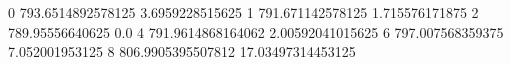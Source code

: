 0 793.6514892578125 3.6959228515625
1 791.671142578125 1.715576171875
2 789.95556640625 0.0
4 791.9614868164062 2.00592041015625
6 797.007568359375 7.052001953125
8 806.9905395507812 17.03497314453125
